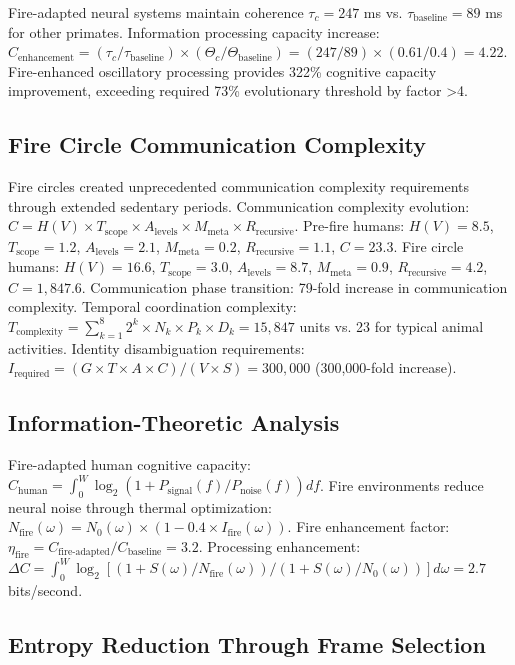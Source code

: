 \documentclass[12pt,a4paper]{article}
\begin{document}
Fire-adapted neural systems maintain coherence $\tau_c = 247$ ms vs. $\tau_{\text{baseline}} = 89$ ms for other primates. Information processing capacity increase: $C_{\text{enhancement}} = (\tau_c/\tau_{\text{baseline}}) \times (\Theta_c/\Theta_{\text{baseline}}) = (247/89) \times (0.61/0.4) = 4.22$. Fire-enhanced oscillatory processing provides 322\% cognitive capacity improvement, exceeding required 73\% evolutionary threshold by factor >4.

\subsection{Fire Circle Communication Complexity}

Fire circles created unprecedented communication complexity requirements through extended sedentary periods. Communication complexity evolution: $C = H(V) \times T_{\text{scope}} \times A_{\text{levels}} \times M_{\text{meta}} \times R_{\text{recursive}}$. Pre-fire humans: $H(V)=8.5$, $T_{\text{scope}}=1.2$, $A_{\text{levels}}=2.1$, $M_{\text{meta}}=0.2$, $R_{\text{recursive}}=1.1$, $C=23.3$. Fire circle humans: $H(V)=16.6$, $T_{\text{scope}}=3.0$, $A_{\text{levels}}=8.7$, $M_{\text{meta}}=0.9$, $R_{\text{recursive}}=4.2$, $C=1,847.6$. Communication phase transition: 79-fold increase in communication complexity. Temporal coordination complexity: $T_{\text{complexity}} = \sum_{k=1}^8 2^k \times N_k \times P_k \times D_k = 15,847$ units vs. 23 for typical animal activities. Identity disambiguation requirements: $I_{\text{required}} = (G \times T \times A \times C)/(V \times S) = 300,000$ (300,000-fold increase).

\subsection{Information-Theoretic Analysis}

Fire-adapted human cognitive capacity: $C_{\text{human}} = \int_0^W \log_2(1 + P_{\text{signal}}(f)/P_{\text{noise}}(f)) df$. Fire environments reduce neural noise through thermal optimization: $N_{\text{fire}}(\omega) = N_0(\omega) \times (1 - 0.4 \times I_{\text{fire}}(\omega))$. Fire enhancement factor: $\eta_{\text{fire}} = C_{\text{fire-adapted}}/C_{\text{baseline}} = 3.2$. Processing enhancement: $\Delta C = \int_0^W \log_2[(1 + S(\omega)/N_{\text{fire}}(\omega))/(1 + S(\omega)/N_0(\omega))] d\omega = 2.7$ bits/second.

\subsection{Entropy Reduction Through Frame Selection}
\end{document}
